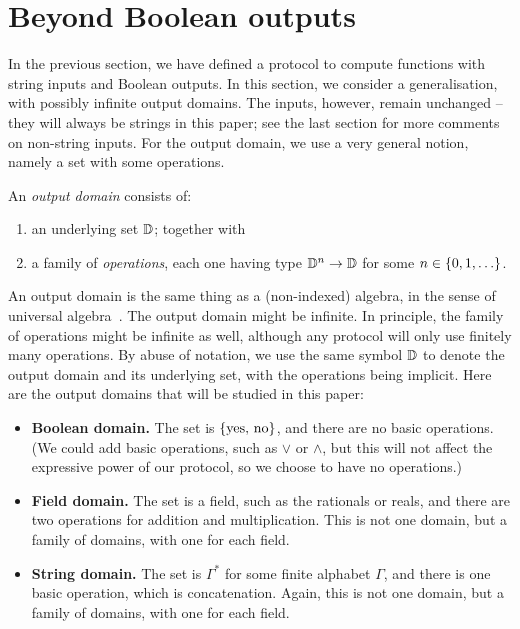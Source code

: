 \section{Beyond Boolean outputs}
\label{sec:beyond-boolean-outputs}

In the previous section, we have defined a protocol to compute functions with string inputs and Boolean outputs. In this section, we consider a generalisation, with possibly infinite output domains. The inputs, however, remain unchanged -- they will always be strings in this paper; see the last section for more comments on non-string inputs.  For the output domain, we use a very general notion, namely a set with some operations. 
\begin{definition}
    An \emph{output domain} consists of: 
    \begin{enumerate}
        \item an underlying set $\mathbb D$; together with
        \item a family of \emph{operations}, each one having  type $\mathbb D^n \to \mathbb D$ for some $n \in \{0,1,\ldots\}$.
    \end{enumerate}
\end{definition}
An output domain is the same thing as a (non-indexed) algebra, in the sense of universal algebra~\cite[p.5]{hobby1988structure}. 
The output domain might be infinite. In principle, the family of operations might be infinite as well, although any protocol will only use finitely many operations.
By abuse of notation, we use the same symbol $\mathbb D$ to denote the output domain and its underlying set, with the operations being implicit. Here are the output domains that will be studied in this paper: 
\begin{itemize}
    \item \textbf{Boolean domain.} The set is $\{\text{yes, no}\}$, and there are no basic operations. (We could add basic operations, such as $\lor$ or $\land$, but this will not affect the expressive power of our protocol, so we choose to have no operations.)
    \item \textbf{Field domain.} The set is a field, such as the rationals or reals, and there are two operations for addition and multiplication. This is not one domain, but a family of domains, with one for each field.
    \item \textbf{String domain.} The set is $\Gamma^*$ for some finite alphabet $\Gamma$, and there is one basic operation, which is concatenation. Again, this is not one domain, but a family of domains, with one for each field.
\end{itemize}

